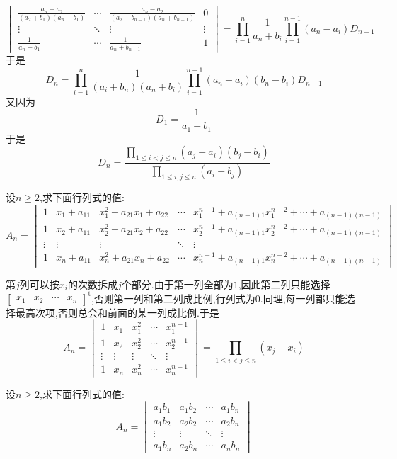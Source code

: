 \documentclass{ctexart}
\begin{document}
\begin{solution}
\[\begin{vmatrix}
        \frac{a_n-a_2}{\left(a_2+b_1\right)\left(a_n+b_1\right)}&\cdots&\frac{a_n-a_2}{\left(a_2+b_{n-1}\right)\left(a_n+b_{n-1}\right)}&0\\
        \vdots&\ddots&\vdots&\vdots\\
        \frac{1}{a_n+b_1}&\cdots&\frac{1}{a_n+b_{n-1}}&1
    \end{vmatrix}=\prod_{i=1}^{n}\dfrac{1}{a_n+b_i}\prod_{i=1}^{n-1}\left(a_n-a_i\right)D_{n-1}\]
    于是
    \[D_n=\prod_{i=1}^{n}\dfrac{1}{\left(a_i+b_n\right)\left(a_n+b_i\right)}\prod_{i=1}^{n-1}\left(a_n-a_i\right)\left(b_n-b_i\right)D_{n-1}\]
    又因为
    \[D_1=\dfrac{1}{a_1+b_1}\]
    于是
    \[D_n=\dfrac{\displaystyle\prod_{1\leqslant i<j\leqslant n}\left(a_j-a_i\right)\left(b_j-b_i\right)}{\displaystyle\prod_{1\leqslant i,j\leqslant n}\left(a_i+b_j\right)}\]
\end{solution}
\begin{problem}
    设$n\geqslant2$,求下面行列式的值:
    \[A_n=\begin{vmatrix}
        1&x_1+a_{11}&x_1^2+a_{21}x_1+a_{22}&\cdots&x_1^{n-1}+a_{(n-1)1}x_1^{n-2}+\cdots+a_{(n-1)(n-1)}\\
        1&x_2+a_{11}&x_2^2+a_{21}x_2+a_{22}&\cdots&x_2^{n-1}+a_{(n-1)1}x_2^{n-2}+\cdots+a_{(n-1)(n-1)}\\
        \vdots&\vdots&\vdots&\ddots&\vdots\\
        1&x_n+a_{11}&x_n^2+a_{21}x_n+a_{22}&\cdots&x_n^{n-1}+a_{(n-1)1}x_n^{n-2}+\cdots+a_{(n-1)(n-1)}
    \end{vmatrix}\]
\end{problem}
\begin{solution}
    第$j$列可以按$x_i$的次数拆成$j$个部分.由于第一列全部为$1$,因此第二列只能选择$\begin{bmatrix}
        x_1&x_2&\cdots&x_n
    \end{bmatrix}^{\text{t}}$,否则第一列和第二列成比例,行列式为$0$.同理,每一列都只能选择最高次项,否则总会和前面的某一列成比例.于是
    \[A_n=\begin{vmatrix}
        1&x_1&x_1^2&\cdots&x_1^{n-1}\\
        1&x_2&x_2^2&\cdots&x_2^{n-1}\\
        \vdots&\vdots&\vdots&\ddots&\vdots\\
        1&x_n&x_n^2&\cdots&x_n^{n-1}
    \end{vmatrix}=\prod_{1\leqslant i<j\leqslant n}\left(x_j-x_i\right)\]
\end{solution}
\begin{problem}
    设$n\geqslant2$,求下面行列式的值:
    \[A_n=\begin{vmatrix}
        a_1b_1&a_1b_2&\cdots&a_1b_n\\
        a_1b_2&a_2b_2&\cdots&a_2b_n\\
        \vdots&\vdots&\ddots&\vdots\\
        a_1b_n&a_2b_n&\cdots&a_nb_n
    \end{vmatrix}\]
\end{problem}
\end{document}
